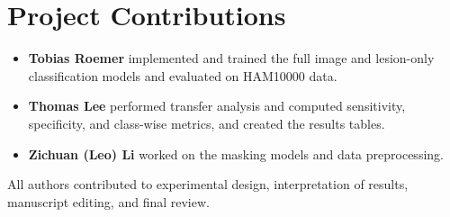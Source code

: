 \documentclass[10pt]{article}
\begin{document}
\section{Project Contributions}
\begin{itemize}
    \item \textbf{Tobias Roemer} implemented and trained the full image and lesion-only classification models and evaluated on HAM10000 data.
    \item \textbf{Thomas Lee} performed transfer analysis and computed sensitivity, specificity, and class-wise metrics, and created the results tables.
    \item \textbf{Zichuan (Leo) Li} worked on the masking models and data preprocessing.
\end{itemize}
All authors contributed to experimental design, interpretation of results, manuscript editing, and final review.
\end{document}
